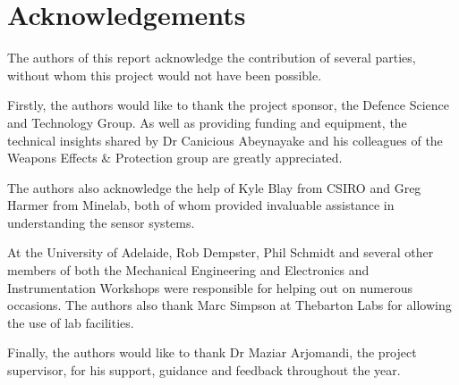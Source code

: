 \documentclass[main.tex]{subfiles}
\begin{document}
{}	%
\chapter*{Acknowledgements} 
The authors of this report acknowledge the contribution of several parties, without whom this project would not have been possible.

Firstly, the authors would like to thank the project sponsor, the Defence Science and Technology Group. As well as providing funding and equipment, the technical insights shared by Dr Canicious Abeynayake and his colleagues of the Weapons Effects \& Protection group are greatly appreciated. 

The authors also acknowledge the help of Kyle Blay from CSIRO and Greg Harmer from Minelab, both of whom provided invaluable assistance in understanding the sensor systems.

At the University of Adelaide, Rob Dempster, Phil Schmidt and several other members of both the Mechanical Engineering and Electronics and Instrumentation Workshops were responsible for helping out on numerous occasions. The authors also thank Marc Simpson at Thebarton Labs for allowing the use of lab facilities. 

Finally, the authors would like to thank Dr Maziar Arjomandi, the project supervisor, for his support, guidance and feedback throughout the year. 
\newpage

{}	%
\renewcommand{\baselinestretch}{1.2}\normalsize 	%
\tableofcontents
\renewcommand{\baselinestretch}{1.3}\normalsize 	%
\newpage

{}	%
\listoffigures
\newpage

{}	%
\listoftables
\newpage


\printnomenclature
\newpage
\end{document}
